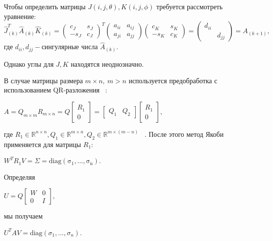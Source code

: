 Чтобы определить матрицы $J(i,j,\theta), K(i,j,\phi)$ требуется рассмотреть уравнение:
\begin{equation}
    \hat{J}_{(k)}^T\hat{A}_{(k)}\hat{K}_{(k)} = \begin{pmatrix}
        c_J&s_J\\
        -s_J&c_J
    \end{pmatrix}^T
    \begin{pmatrix}
        a_{ii}&a_{ij}\\
        a_{ji}&a_{jj}
    \end{pmatrix}
    \begin{pmatrix}
        c_K&s_K\\
        -s_K&c_K
    \end{pmatrix} = \begin{pmatrix}
        d_{ii} &\\
        &d_{jj}
    \end{pmatrix} = A_{(k+1)},
\end{equation}
где $d_{ii}, d_{jj} -\text{сингулярные числа } \hat{A}_{(k)}$.

Однако углы для $J, K$ находятся неоднозначно.

В случае матрицы размера $m \times n, \ m>n$ используется предобработка с использованием QR-разложения ~\cite{10.5555/867597}: 
\begin{center}
    $A = Q_{m\times m}R_{m\times n} = Q\begin{bmatrix}
        R_1\\0
    \end{bmatrix} = \begin{bmatrix}
        Q_1&Q_2
    \end{bmatrix}
    \begin{bmatrix}
        R_1\\0
    \end{bmatrix},
    $
\end{center}
где $R_1 \in \mathbb{R}^{n\times n}, Q_1 \in \mathbb{R}^{m\times n}, Q_2\in \mathbb{R}^{m\times (m-n)}$ ~\cite{Golub2013}. После этого метод Якоби применяется для матрицы $R_1$:
\begin{center}
    $W^TR_1V=\Sigma = \mathrm{diag(\sigma_1,...,\sigma_n)}$.
\end{center}
Определяя 
\begin{center}
    $U = Q\begin{bmatrix}
        W&0\\0&I
    \end{bmatrix},$    
\end{center}
мы получаем
\begin{center}
     $U^TAV = \mathrm{diag}(\sigma_1,...,\sigma_n)$.
\end{center}


